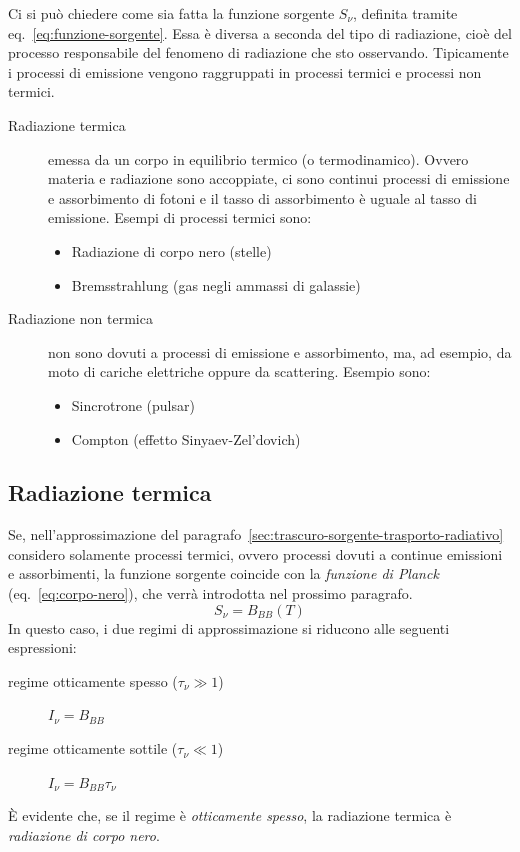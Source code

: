 Ci si può chiedere come sia fatta la funzione sorgente $S_\nu$, definita tramite eq.~\eqref{eq:funzione-sorgente}. Essa è diversa a seconda del tipo di radiazione, cioè del processo responsabile del fenomeno di radiazione che sto osservando. Tipicamente i processi di emissione vengono raggruppati in processi termici e processi non termici.
\begin{description}
    \item[Radiazione termica] emessa da un corpo in equilibrio termico (o termodinamico). Ovvero materia e radiazione sono accoppiate, ci sono continui processi di emissione e assorbimento di fotoni e il tasso di assorbimento è uguale al tasso di emissione. Esempi di processi termici sono:
    \begin{itemize}
        \item Radiazione di corpo nero (stelle)
        \item Bremsstrahlung (gas negli ammassi di galassie)
    \end{itemize}
    
    \item[Radiazione non termica] non sono dovuti a processi di emissione e assorbimento, ma, ad esempio, da moto di cariche elettriche oppure da scattering. Esempio sono:
    \begin{itemize}
        \item Sincrotrone (pulsar)
        \item Compton (effetto Sinyaev-Zel'dovich)
    \end{itemize}
\end{description}

\subsection{Radiazione termica}
Se, nell'approssimazione del paragrafo~\ref{sec:trascuro-sorgente-trasporto-radiativo} considero solamente processi termici, ovvero processi dovuti a continue emissioni e assorbimenti, la funzione sorgente coincide con la \emph{funzione di Planck} (eq.~\eqref{eq:corpo-nero}), che verrà introdotta nel prossimo paragrafo.
\[
    S_\nu = B_{BB} (T)
\]
In questo caso, i due regimi di approssimazione si riducono alle seguenti espressioni:
\begin{description}
    \item[regime otticamente spesso ($\tau_\nu \gg 1$)] $I_\nu = B_{BB}$
    \item[regime otticamente sottile ($\tau_\nu \ll 1$)] $I_\nu = B_{BB} \tau_\nu$
\end{description}
È evidente che, se il regime è \emph{otticamente spesso}, la radiazione termica è \emph{radiazione di corpo nero}.
